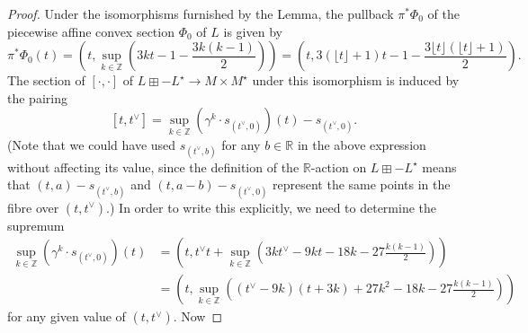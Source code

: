 \documentclass[10pt,a4paper]{amsart}
\newcommand{\RR}{\mathbb{R}}
\newcommand{\ZZ}{\mathbb{Z}}
\begin{document}
\begin{proof}
Under the isomorphisms furnished by the Lemma, the pullback $\pi^*\Phi_0$ of the piecewise affine convex section $\Phi_0$ of $L$  is given by 
\[
\pi^*\Phi_0(t)=\left(t,\sup_{k\in\ZZ}\left(3kt-1-\frac{3k(k-1)}{2}\right)\right) = \left(t,3(\lfloor t \rfloor +1)t-1-\frac{3\lfloor t \rfloor(\lfloor t \rfloor+1)}{2}\right).
\]
The section of $[\cdot,\cdot]$ of $L\boxplus-L^\star \to M\times M^\star$ under this isomorphism is induced by the pairing
\[
[t,t^\vee] = \sup_{k\in\ZZ}(\gamma^k \cdot s_{(t^\vee,0)})(t) - s_{(t^\vee,0)}.
\]
(Note that we could have used $s_{(t^\vee,b)}$ for any $b\in \RR$ in the above expression without affecting its value, since the definition of the $\RR$-action on $L\boxplus-L^\star$ means that $(t,a)-s_{(t^\vee,b)}$ and $(t,a-b)-s_{(t^\vee,0)}$ represent the same points in the fibre over $(t,t^\vee)$.) In order to write this explicitly, we need to determine the supremum
\begin{align*}
    \sup_{k\in\ZZ}(\gamma^k \cdot s_{(t^\vee,0)})(t) &= \left(t,t^\vee t +\sup_{k\in\ZZ}\left(3kt^\vee-9kt-18k-27\frac{k(k-1)}{2}\right)\right)\\
    &=\left(t,\sup_{k\in\ZZ} \left((t^\vee-9k)(t+3k)+27k^2-18k-27\frac{k(k-1)}{2}\right)\right)
\end{align*}
for any given value of $(t,t^\vee)$. Now 


\end{proof}
\end{document}
